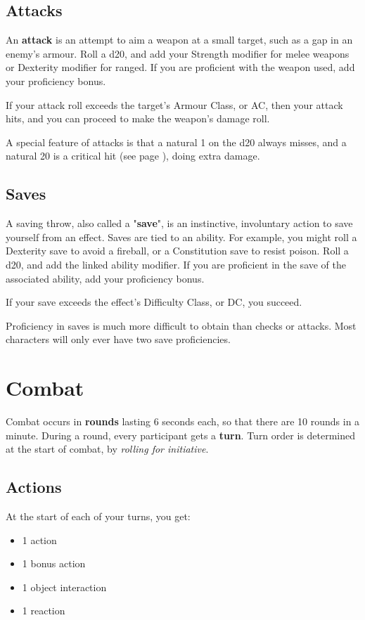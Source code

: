 \documentclass[letterpaper,twocolumn,openany,nodeprecatedcode,bg=print]{dndbook}
\newcommand{\pg}[1]{page \pageref{#1}}
\newcommand{\see}[1]{(see \pg{#1})}
\begin{document}
\subsection{Attacks}
An \textbf{attack} is an attempt to aim a weapon at a small target, such as a gap in an enemy's armour. 
Roll a d20, and add your Strength modifier for melee weapons or Dexterity modifier for ranged. 
If you are proficient with the weapon used, add your proficiency bonus.

If your attack roll exceeds the target's Armour Class, or AC, then your attack hits, and you can proceed to make the weapon's damage roll.

A special feature of attacks is that a natural 1 on the d20 always misses, and a natural 20 is a critical hit \see{critical-hit}, doing extra damage.

\subsection{Saves}
A saving throw, also called a "\textbf{save}", is an instinctive, involuntary action to save yourself from an effect. 
Saves are tied to an ability. 
For example, you might roll a Dexterity save to avoid a fireball, or a Constitution save to resist poison. 
Roll a d20, and add the linked ability modifier. 
If you are proficient in the save of the associated ability, add your proficiency bonus.

If your save exceeds the effect's Difficulty Class, or DC, you succeed.

Proficiency in saves is much more difficult to obtain than checks or attacks. 
Most characters will only ever have two save proficiencies.





\section{Combat}
Combat occurs in \textbf{rounds} lasting 6 seconds each, so that there are 10 rounds in a minute. 
During a round, every participant gets a \textbf{turn}. 
Turn order is determined at the start of combat, by \textit{rolling for initiative}.

\subsection{Actions}
At the start of each of your turns, you get:

\begin{itemize}
\item 1 action
\item 1 bonus action
\item 1 object interaction
\item 1 reaction
\end{itemize}
\end{document}
